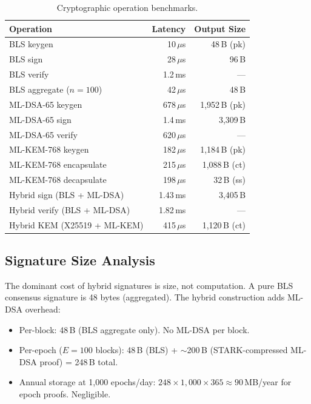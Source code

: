 \begin{table}[ht]
\centering
\caption{Cryptographic operation benchmarks.}
\label{tab:benchmarks}
\begin{tabular}{lrr}
\toprule
\textbf{Operation} & \textbf{Latency} & \textbf{Output Size} \\
\midrule
BLS keygen & 10\,$\mu$s & 48\,B (pk) \\
BLS sign & 28\,$\mu$s & 96\,B \\
BLS verify & 1.2\,ms & --- \\
BLS aggregate ($n = 100$) & 42\,$\mu$s & 48\,B \\
\midrule
ML-DSA-65 keygen & 678\,$\mu$s & 1{,}952\,B (pk) \\
ML-DSA-65 sign & 1.4\,ms & 3{,}309\,B \\
ML-DSA-65 verify & 620\,$\mu$s & --- \\
\midrule
ML-KEM-768 keygen & 182\,$\mu$s & 1{,}184\,B (pk) \\
ML-KEM-768 encapsulate & 215\,$\mu$s & 1{,}088\,B (ct) \\
ML-KEM-768 decapsulate & 198\,$\mu$s & 32\,B (ss) \\
\midrule
Hybrid sign (BLS + ML-DSA) & 1.43\,ms & 3{,}405\,B \\
Hybrid verify (BLS + ML-DSA) & 1.82\,ms & --- \\
Hybrid KEM (X25519 + ML-KEM) & 415\,$\mu$s & 1{,}120\,B (ct) \\
\bottomrule
\end{tabular}
\end{table}

\subsection{Signature Size Analysis}

The dominant cost of hybrid signatures is size, not computation. A pure BLS consensus
signature is 48 bytes (aggregated). The hybrid construction adds ML-DSA overhead:

\begin{itemize}[leftmargin=2em]
  \item Per-block: 48\,B (BLS aggregate only). No ML-DSA per block.
  \item Per-epoch ($E = 100$ blocks): 48\,B (BLS) + $\sim$200\,B (STARK-compressed
        ML-DSA proof) = 248\,B total.
  \item Annual storage at 1{,}000 epochs/day: $248 \times 1{,}000 \times 365 \approx
        90$\,MB/year for epoch proofs. Negligible.
\end{itemize}

